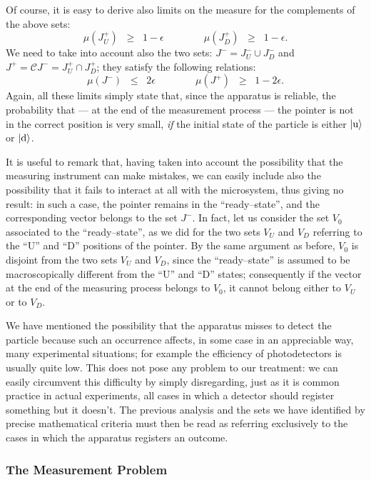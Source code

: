 \documentclass[12pt]{article}
\begin{document}
Of course, it is easy to derive also limits on the measure for the
complements of the above sets:
\[
\mu(J^{+}_{U}) \;\; \geq \;\; 1 - \epsilon \qquad\qquad
\mu(J^{+}_{D}) \;\; \geq \;\; 1 - \epsilon.
\]
We need to take into account also the two sets: $J^{-} = J^{-}_{U}
\cup J^{-}_{D}$ and $J^{+} = {\mathcal C}J^{-} = J^{+}_{U} \cap
J^{+}_{D}$; they satisfy the following relations:
\[
\mu(J^{-}) \;\; \leq \;\; 2\epsilon \qquad\qquad \mu(J^{+}) \;\;
\geq \;\; 1 - 2\epsilon.
\]
Again, all these limits simply state that, since the apparatus is
reliable, the probability that --- at the end of the measurement
process --- the pointer is not in the correct position is very
small, {\it if} the initial state of the particle is either
$|\makebox{u}\rangle$ or $|\makebox{d}\rangle$.

It is useful to remark that, having taken into account the
possibility that the measuring instrument can make mistakes, we
can easily include also the possibility that it fails to interact
at all with the microsystem, thus giving no result: in such a
case, the pointer remains in the ``ready--state'', and the
corresponding vector belongs to the set $J^{-}$. In fact, let us
consider the set $V_{0}$ associated to the ``ready--state'', as we
did for the two  sets $V_{U}$ and $V_{D}$ referring to the ``U''
and ``D''  positions of the pointer. By the same argument as
before,  $V_{0}$ is disjoint from the two sets $V_{U}$ and
$V_{D}$, since the ``ready--state'' is assumed to be
macroscopically different from the ``U'' and ``D'' states;
consequently if the vector at the end of the measuring process
belongs to $V_{0}$, it cannot belong either to $V_{U}$ or to
$V_{D}$.

We have mentioned the possibility that the apparatus misses to
detect the particle because such an occurrence affects, in some
case in an appreciable way, many experimental situations; for
example the efficiency of photodetectors is usually quite low.
This does not pose any problem to our treatment: we can easily
circumvent this difficulty by simply disregarding, just as it is
common practice in actual experiments, all cases in which a
detector should register something but it doesn't. The previous
analysis and the sets we have identified by precise mathematical
criteria must then be read as referring exclusively to the cases
in which the apparatus registers an outcome.


\subsubsection{The Measurement Problem} \label{sec225}
\end{document}
